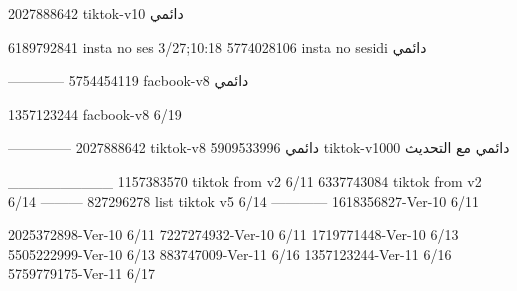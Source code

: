 2027888642 tiktok-v10
دائمي

6189792841 insta no ses
3/27;10:18
5774028106 insta no sesidi
دائمي

------------
5754454119 facbook-v8
دائمي

1357123244 facbook-v8
6/19

--------------
2027888642 tiktok-v8
دائمي
5909533996 tiktok-v1000
دائمي مع التحديث

__________
1157383570 tiktok from v2
6/11
6337743084 tiktok from v2
6/14
---------
827296278 list tiktok v5
6/14
------------
1618356827-Ver-10
6/11

2025372898-Ver-10
6/11
7227274932-Ver-10
6/11
1719771448-Ver-10
6/13
5505222999-Ver-10
6/13
883747009-Ver-11
6/16
1357123244-Ver-11
6/16
5759779175-Ver-11
6/17
